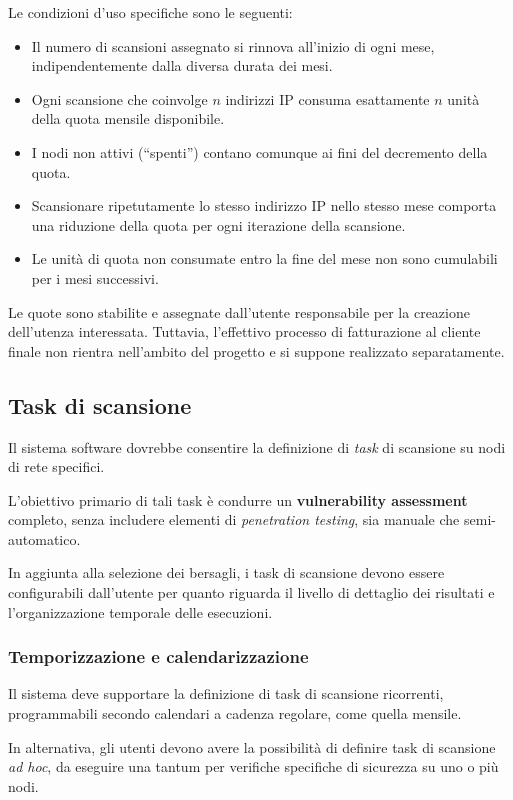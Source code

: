 Le condizioni d'uso specifiche sono le seguenti:
\begin{itemize}
    \item Il numero di scansioni assegnato si rinnova all'inizio di ogni mese, indipendentemente dalla diversa durata dei mesi.
    \item Ogni scansione che coinvolge $n$ indirizzi IP consuma esattamente $n$ unità della quota mensile disponibile.
    \item I nodi non attivi (``spenti'') contano comunque ai fini del decremento della quota.
    \item Scansionare ripetutamente lo stesso indirizzo IP nello stesso mese comporta una riduzione della quota per ogni iterazione della scansione.
    \item Le unità di quota non consumate entro la fine del mese non sono cumulabili per i mesi successivi.
\end{itemize}

Le quote sono stabilite e assegnate dall'utente responsabile per la creazione dell'utenza interessata. Tuttavia, l'effettivo processo di fatturazione al cliente finale non rientra nell'ambito del progetto e si suppone realizzato separatamente.

\subsection{Task di scansione}
Il sistema software dovrebbe consentire la definizione di \emph{task} di scansione su nodi di rete specifici.

L'obiettivo primario di tali task è condurre un \textbf{vulnerability assessment} completo, senza includere elementi di \emph{penetration testing}, sia manuale che semi-automatico.

In aggiunta alla selezione dei bersagli, i task di scansione devono essere configurabili dall'utente per quanto riguarda il livello di dettaglio dei risultati e l'organizzazione temporale delle esecuzioni.

\subsubsection{Temporizzazione e calendarizzazione}
Il sistema deve supportare la definizione di task di scansione ricorrenti, programmabili secondo calendari a cadenza regolare, come quella mensile.

In alternativa, gli utenti devono avere la possibilità di definire task di scansione \emph{ad hoc}, da eseguire una tantum per verifiche specifiche di sicurezza su uno o più nodi.

